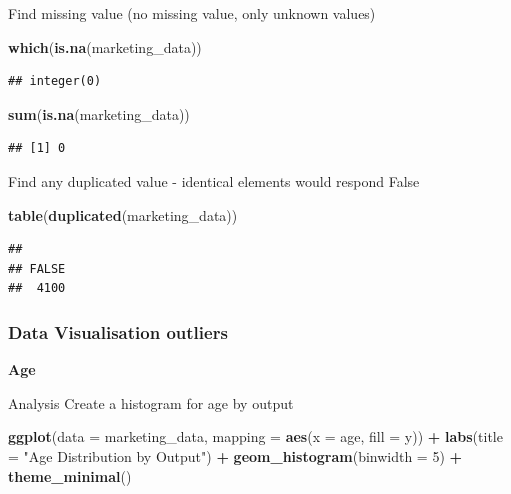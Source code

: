 \documentclass[
]{article}
\newenvironment{Shaded}{\begin{snugshade}}{\end{snugshade}}
\newcommand{\AttributeTok}[1]{\textcolor[rgb]{0.13,0.29,0.53}{#1}}
\newcommand{\DecValTok}[1]{\textcolor[rgb]{0.00,0.00,0.81}{#1}}
\newcommand{\FunctionTok}[1]{\textcolor[rgb]{0.13,0.29,0.53}{\textbf{#1}}}
\newcommand{\NormalTok}[1]{#1}
\newcommand{\SpecialCharTok}[1]{\textcolor[rgb]{0.81,0.36,0.00}{\textbf{#1}}}
\newcommand{\StringTok}[1]{\textcolor[rgb]{0.31,0.60,0.02}{#1}}
\begin{document}
Find missing value (no missing value, only unknown values)

\begin{Shaded}
\begin{Highlighting}[]
\FunctionTok{which}\NormalTok{(}\FunctionTok{is.na}\NormalTok{(marketing\_data))}
\end{Highlighting}
\end{Shaded}

\begin{verbatim}
## integer(0)
\end{verbatim}

\begin{Shaded}
\begin{Highlighting}[]
\FunctionTok{sum}\NormalTok{(}\FunctionTok{is.na}\NormalTok{(marketing\_data))}
\end{Highlighting}
\end{Shaded}

\begin{verbatim}
## [1] 0
\end{verbatim}

Find any duplicated value - identical elements would respond False

\begin{Shaded}
\begin{Highlighting}[]
\FunctionTok{table}\NormalTok{(}\FunctionTok{duplicated}\NormalTok{(marketing\_data))}
\end{Highlighting}
\end{Shaded}

\begin{verbatim}
## 
## FALSE 
##  4100
\end{verbatim}

\subsubsection{Data Visualisation
outliers}\label{data-visualisation-outliers}

\textbf{Age}

Analysis Create a histogram for age by output

\begin{Shaded}
\begin{Highlighting}[]
\FunctionTok{ggplot}\NormalTok{(}\AttributeTok{data =}\NormalTok{ marketing\_data, }\AttributeTok{mapping =} \FunctionTok{aes}\NormalTok{(}\AttributeTok{x =}\NormalTok{ age, }\AttributeTok{fill =}\NormalTok{ y)) }\SpecialCharTok{+} \FunctionTok{labs}\NormalTok{(}\AttributeTok{title =} \StringTok{"Age Distribution by Output"}\NormalTok{) }\SpecialCharTok{+} \FunctionTok{geom\_histogram}\NormalTok{(}\AttributeTok{binwidth =} \DecValTok{5}\NormalTok{) }\SpecialCharTok{+} \FunctionTok{theme\_minimal}\NormalTok{()}
\end{Highlighting}
\end{Shaded}
\end{document}
